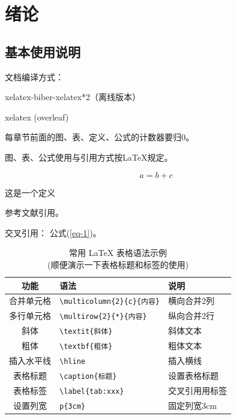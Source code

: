 \pagestyle{fancy}
\fancyhead{} %
\fancyfoot[C]{\xiaowuhao \thepage} %
\renewcommand{\headrulewidth}{1pt} %
\renewcommand{\footrulewidth}{0pt}

\section{绪论}
\setcounter{section}{1}
\setcounter{subsection}{0}
\setcounter{table}{0}
\setcounter{figure}{0}
\setcounter{equation}{0}
\setcounter{definition}{0}

\subsection{基本使用说明}
文档编译方式：

xelatex-biber-xelatex*2（离线版本）

xelatex (overleaf)

每章节前面的图、表、定义、公式的计数器要归0。

图、表、公式使用与引用方式按\LaTeX 规定。

\begin{equation}
    a=b+c \label{eq-1}
\end{equation}

\begin{definition}
    这是一个定义
\end{definition}

参考文献引用\cite{kai1979prospect}。

交叉引用： 公式(\ref{eq-1})。

\begin{table}[h!]
    \centering
    \caption{常用 \LaTeX{} 表格语法示例\\(顺便演示一下表格标题和标签的使用)}
    \label{tab:latex_example}
    \renewcommand{\arraystretch}{1.3}
    \begin{tabular}{cll}
        \toprule
        \textbf{功能} & \textbf{语法}                   & \textbf{说明} \\
        \midrule
        合并单元格       & \verb|\multicolumn{2}{c}{内容}| & 横向合并2列      \\
        多行单元格       & \verb|\multirow{2}{*}{内容}|    & 纵向合并2行      \\
        斜体          & \verb|\textit{斜体}|            & 斜体文本        \\
        粗体          & \verb|\textbf{粗体}|            & 粗体文本        \\
        插入水平线       & \verb|\hline|                 & 插入横线        \\
        表格标题        & \verb|\caption{标题}|           & 设置表格标题      \\
        表格标签        & \verb|\label{tab:xxx}|        & 交叉引用用标签     \\
        设置列宽        & \verb|p{3cm}|                 & 固定列宽3cm     \\
        \bottomrule
    \end{tabular}
\end{table}

